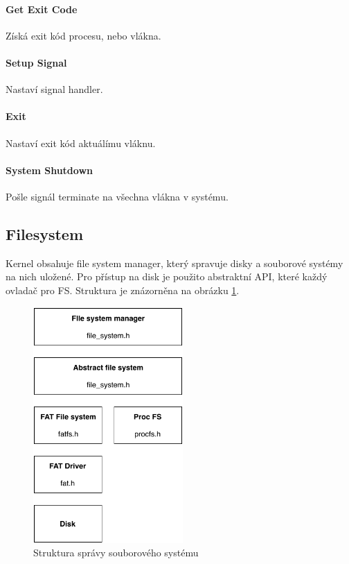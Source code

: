 \documentclass[11pt,a4paper]{scrartcl}
\begin{document}
	\paragraph{Get Exit Code}
	Získá exit kód procesu, nebo vlákna.
	
	\paragraph{Setup Signal}
	Nastaví signal handler.
	
	\paragraph{Exit}
	Nastaví exit kód aktuálímu vláknu.
	
	\paragraph{System Shutdown}
	Pošle signál terminate na všechna vlákna v systému.

	
	\subsection{Filesystem}
	
	Kernel obsahuje file system manager, který spravuje disky a souborové systémy na nich uložené. Pro přístup na disk je použito abstraktní API, které každý ovladač pro FS. Struktura je znázorněna na obrázku \ref{fig:fs-layers}. 
	
	\begin{figure}[H]
		\centering
		\includegraphics[height=9cm]{fs-layers.pdf}
		\caption{Struktura správy souborového systému}
		\label{fig:fs-layers}
	\end{figure}
	
\end{document}
